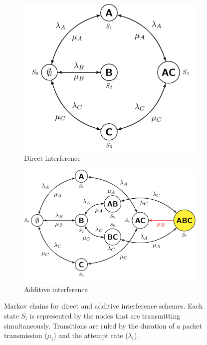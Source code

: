 \documentclass[12pt, a4paper,twoside]{tesi_upf}
\begin{document}
				\begin{figure}[t!]
					\centering
					\begin{subfigure}[b]{0.35\textwidth}
						\includegraphics[width=\textwidth]{images/ctmn_direct}
						\caption{Direct interference}
						\label{fig:direct}
					\end{subfigure}
					\begin{subfigure}[b]{0.45\textwidth}
						\includegraphics[width=\textwidth]{images/ctmn_additive}
						\caption{Additive interference}
						\label{fig:additive}
					\end{subfigure}		
					\caption{Markov chains for direct and additive interference schemes. Each state $S_i$ is represented by the nodes that are transmitting simultaneously. Transitions are ruled by the duration of a packet transmission ($\mu_i$) and the attempt rate ($\lambda_i$).}
					\label{fig:ctmn}
				\end{figure}			
\end{document}
